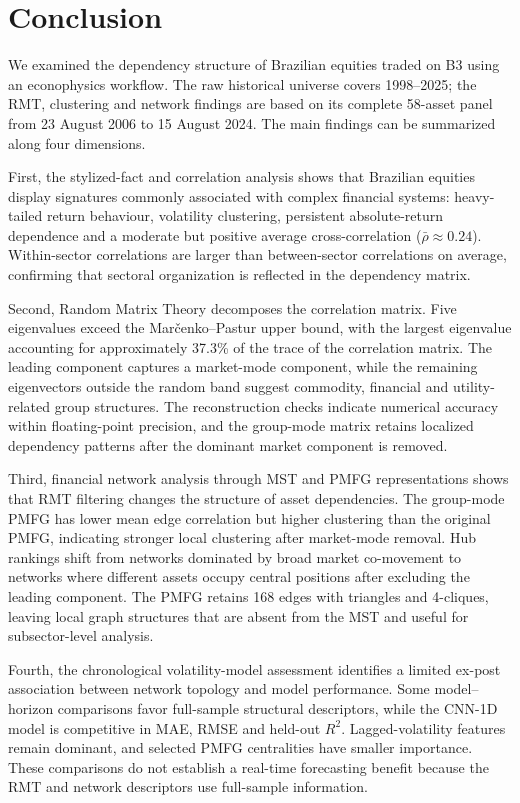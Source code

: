 \section{Conclusion}
\label{sec:conclusion}

We examined the dependency structure of Brazilian equities traded on B3 using an econophysics workflow. The raw historical universe covers 1998--2025; the RMT, clustering and network findings are based on its complete 58-asset panel from 23 August 2006 to 15 August 2024. The main findings can be summarized along four dimensions.

First, the stylized-fact and correlation analysis shows that Brazilian equities display signatures commonly associated with complex financial systems: heavy-tailed return behaviour, volatility clustering, persistent absolute-return dependence and a moderate but positive average cross-correlation ($\bar{\rho}\approx0.24$). Within-sector correlations are larger than between-sector correlations on average, confirming that sectoral organization is reflected in the dependency matrix.

Second, Random Matrix Theory decomposes the correlation matrix. Five eigenvalues exceed the Mar\v{c}enko--Pastur upper bound, with the largest eigenvalue accounting for approximately 37.3\% of the trace of the correlation matrix. The leading component captures a market-mode component, while the remaining eigenvectors outside the random band suggest commodity, financial and utility-related group structures. The reconstruction checks indicate numerical accuracy within floating-point precision, and the group-mode matrix retains localized dependency patterns after the dominant market component is removed.

Third, financial network analysis through MST and PMFG representations shows that RMT filtering changes the structure of asset dependencies. The group-mode PMFG has lower mean edge correlation but higher clustering than the original PMFG, indicating stronger local clustering after market-mode removal. Hub rankings shift from networks dominated by broad market co-movement to networks where different assets occupy central positions after excluding the leading component. The PMFG retains 168 edges with triangles and 4-cliques, leaving local graph structures that are absent from the MST and useful for subsector-level analysis.

Fourth, the chronological volatility-model assessment identifies a limited ex-post association between network topology and model performance. Some model--horizon comparisons favor full-sample structural descriptors, while the CNN-1D model is competitive in MAE, RMSE and held-out $R^2$. Lagged-volatility features remain dominant, and selected PMFG centralities have smaller importance. These comparisons do not establish a real-time forecasting benefit because the RMT and network descriptors use full-sample information.

